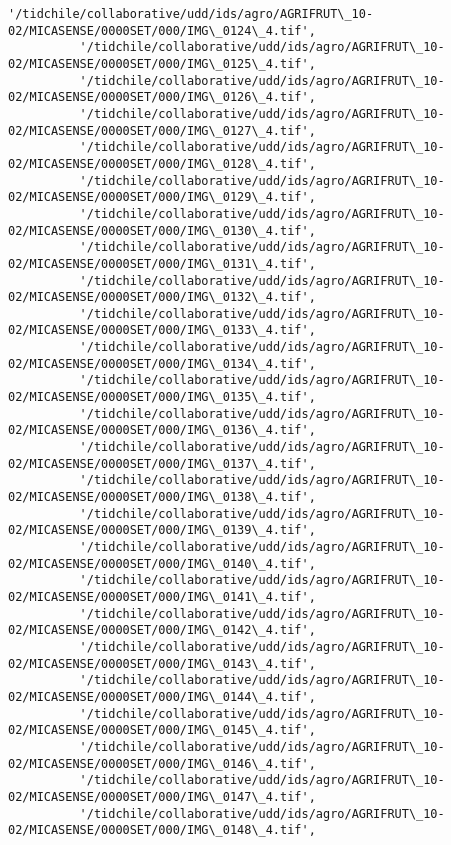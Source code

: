 \documentclass[11pt]{article}
\begin{document}
\begin{Verbatim}[commandchars=\\\{\}]
          '/tidchile/collaborative/udd/ids/agro/AGRIFRUT\_10-02/MICASENSE/0000SET/000/IMG\_0124\_4.tif',
          '/tidchile/collaborative/udd/ids/agro/AGRIFRUT\_10-02/MICASENSE/0000SET/000/IMG\_0125\_4.tif',
          '/tidchile/collaborative/udd/ids/agro/AGRIFRUT\_10-02/MICASENSE/0000SET/000/IMG\_0126\_4.tif',
          '/tidchile/collaborative/udd/ids/agro/AGRIFRUT\_10-02/MICASENSE/0000SET/000/IMG\_0127\_4.tif',
          '/tidchile/collaborative/udd/ids/agro/AGRIFRUT\_10-02/MICASENSE/0000SET/000/IMG\_0128\_4.tif',
          '/tidchile/collaborative/udd/ids/agro/AGRIFRUT\_10-02/MICASENSE/0000SET/000/IMG\_0129\_4.tif',
          '/tidchile/collaborative/udd/ids/agro/AGRIFRUT\_10-02/MICASENSE/0000SET/000/IMG\_0130\_4.tif',
          '/tidchile/collaborative/udd/ids/agro/AGRIFRUT\_10-02/MICASENSE/0000SET/000/IMG\_0131\_4.tif',
          '/tidchile/collaborative/udd/ids/agro/AGRIFRUT\_10-02/MICASENSE/0000SET/000/IMG\_0132\_4.tif',
          '/tidchile/collaborative/udd/ids/agro/AGRIFRUT\_10-02/MICASENSE/0000SET/000/IMG\_0133\_4.tif',
          '/tidchile/collaborative/udd/ids/agro/AGRIFRUT\_10-02/MICASENSE/0000SET/000/IMG\_0134\_4.tif',
          '/tidchile/collaborative/udd/ids/agro/AGRIFRUT\_10-02/MICASENSE/0000SET/000/IMG\_0135\_4.tif',
          '/tidchile/collaborative/udd/ids/agro/AGRIFRUT\_10-02/MICASENSE/0000SET/000/IMG\_0136\_4.tif',
          '/tidchile/collaborative/udd/ids/agro/AGRIFRUT\_10-02/MICASENSE/0000SET/000/IMG\_0137\_4.tif',
          '/tidchile/collaborative/udd/ids/agro/AGRIFRUT\_10-02/MICASENSE/0000SET/000/IMG\_0138\_4.tif',
          '/tidchile/collaborative/udd/ids/agro/AGRIFRUT\_10-02/MICASENSE/0000SET/000/IMG\_0139\_4.tif',
          '/tidchile/collaborative/udd/ids/agro/AGRIFRUT\_10-02/MICASENSE/0000SET/000/IMG\_0140\_4.tif',
          '/tidchile/collaborative/udd/ids/agro/AGRIFRUT\_10-02/MICASENSE/0000SET/000/IMG\_0141\_4.tif',
          '/tidchile/collaborative/udd/ids/agro/AGRIFRUT\_10-02/MICASENSE/0000SET/000/IMG\_0142\_4.tif',
          '/tidchile/collaborative/udd/ids/agro/AGRIFRUT\_10-02/MICASENSE/0000SET/000/IMG\_0143\_4.tif',
          '/tidchile/collaborative/udd/ids/agro/AGRIFRUT\_10-02/MICASENSE/0000SET/000/IMG\_0144\_4.tif',
          '/tidchile/collaborative/udd/ids/agro/AGRIFRUT\_10-02/MICASENSE/0000SET/000/IMG\_0145\_4.tif',
          '/tidchile/collaborative/udd/ids/agro/AGRIFRUT\_10-02/MICASENSE/0000SET/000/IMG\_0146\_4.tif',
          '/tidchile/collaborative/udd/ids/agro/AGRIFRUT\_10-02/MICASENSE/0000SET/000/IMG\_0147\_4.tif',
          '/tidchile/collaborative/udd/ids/agro/AGRIFRUT\_10-02/MICASENSE/0000SET/000/IMG\_0148\_4.tif',

\end{Verbatim}
\end{document}
